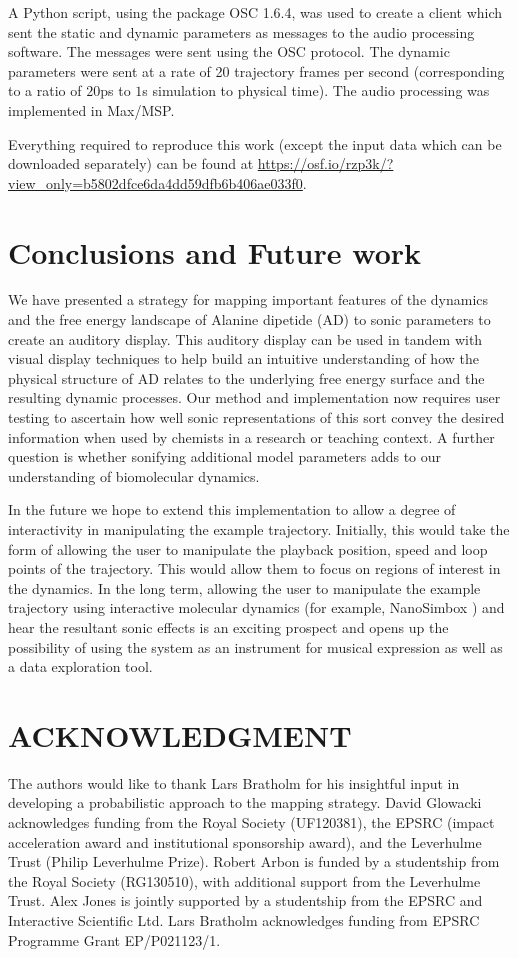 \documentclass[a4paper,10pt,oneside]{article}
\begin{document}
\begin{sloppy}
A Python script, using the package OSC 1.6.4, was used to create a client which sent the static and dynamic parameters as messages to the audio processing software. The messages were sent using the OSC protocol. The dynamic parameters were sent at a rate of 20 trajectory frames per second (corresponding to a ratio of $20$ps to $1$s simulation to physical time). The audio processing was implemented in Max/MSP.
 
Everything required to reproduce this work (except the input data which can be downloaded separately) can be found at \url{https://osf.io/rzp3k/?view_only=b5802dfce6da4dd59dfb6b406ae033f0}.  

\section{Conclusions and Future work}\label{sec:conclusions}

We have presented a strategy for mapping important features of the dynamics and the free energy landscape of Alanine dipetide (AD) to sonic parameters to create an auditory display.  This auditory display can be used in tandem with visual display techniques to help build an intuitive understanding of how the physical structure of AD relates to the underlying free energy surface and the resulting dynamic processes. Our method and implementation  now requires user testing to ascertain how well sonic representations of this sort convey the desired information when used by chemists in a research or teaching context. A further question  is whether sonifying additional model parameters adds to our understanding of biomolecular dynamics. 

In the future we hope to extend this implementation to allow a degree of interactivity in manipulating the example trajectory. Initially, this would take the form of allowing the user to manipulate the playback position, speed and loop points of the trajectory. This would allow them to focus on regions of interest in the dynamics. In the long term, allowing the user to manipulate the example trajectory using interactive molecular dynamics  (for example, NanoSimbox \cite{2018arXiv180102884C}) and hear the resultant sonic effects is an exciting prospect and opens up the possibility of using the system as an instrument for musical expression as well as a data exploration tool.   

\section{ACKNOWLEDGMENT}
The authors would like to thank Lars Bratholm for his insightful input in developing a probabilistic approach to the mapping strategy. 
David Glowacki acknowledges funding from the Royal Society (UF120381), the EPSRC (impact acceleration award and institutional sponsorship award), and the Leverhulme Trust (Philip Leverhulme Prize). Robert Arbon is funded by a studentship from the Royal Society (RG130510), with additional support from the Leverhulme Trust. Alex Jones is jointly supported by a studentship from the EPSRC and Interactive Scientific Ltd. Lars Bratholm acknowledges funding from EPSRC Programme Grant EP/P021123/1.
\label{sec:ack}



\end{sloppy}
\end{document}
